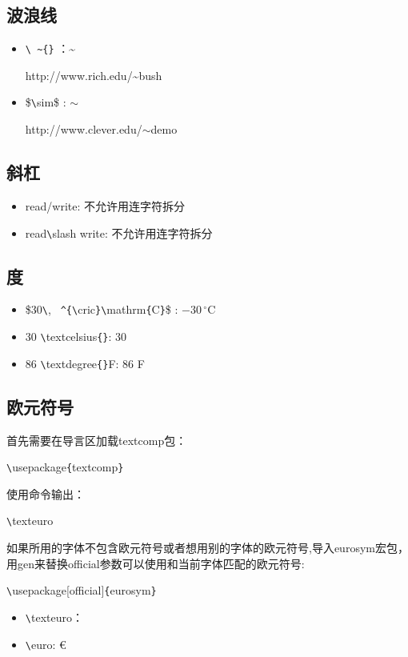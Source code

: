 \documentclass[UTF8]{ctexart}
\begin{document}
\subsection{波浪线}
\begin{itemize}
    \item \texttt{\textbackslash}\texttt{~\~}\texttt{\{}\texttt{\}} ：\~{}

http://www.rich.edu/\~{}bush
    \item \$\texttt{\textbackslash}sim\$ : $\sim$

http://www.clever.edu/$\sim$demo
\end{itemize}
\subsection{斜杠}
\begin{itemize}
  \item read/write: 不允许用连字符拆分
  \item read\texttt{\textbackslash}slash write: 不允许用连字符拆分
\end{itemize}
\subsection{度}
\begin{itemize}
  \item \$30\texttt{\textbackslash}, \texttt{~\^}\texttt{\{}\texttt{\textbackslash}cric\texttt{\}}\texttt{\textbackslash}mathrm\texttt{\{}C\texttt{\}}\$ :
$-30\,^{\circ}\mathrm{C}$
  \item 30 \texttt{\textbackslash}textcelsius\texttt{\{}\texttt{\}}: 30 \textcelsius{}
  \item 86 \texttt{\textbackslash}textdegree\texttt{\{}\texttt{\}}F: 86 \textdegree{}F
\end{itemize}
\subsection{欧元符号}
 首先需要在导言区加载textcomp包：

 \texttt{\textbackslash}usepackage\texttt{\{}textcomp\texttt{\}}

 使用命令输出：

 \texttt{\textbackslash}texteuro

 如果所用的字体不包含欧元符号或者想用别的字体的欧元符号,导入eurosym宏包，用gen来替换official参数可以使用和当前字体匹配的欧元符号:

 \texttt{\textbackslash}usepackage[official]\texttt{\{}eurosym\texttt{\}}
 \begin{itemize}
  \item \texttt{\textbackslash}texteuro：\texteuro
  \item \texttt{\textbackslash}euro: \euro
\end{itemize}
\end{document}
